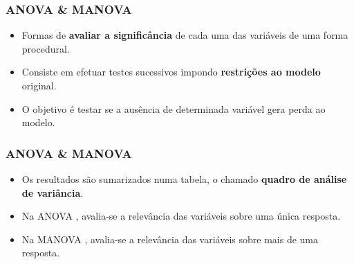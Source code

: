 \documentclass[10pt,
  aspectratio=169,
  serif,
  mathserif,
  professionalfont,
  compress,
  handout,
  ]{beamer}\usepackage[]{graphicx}\usepackage[]{color}
\begin{document}

\begin{frame}
  \frametitle{ANOVA \& MANOVA}

  \begin{itemize}
    \itemsep 2ex

  \item Formas de \textbf{avaliar a significância} de cada uma das variáveis de uma forma procedural.  
  
  \item Consiste em efetuar testes sucessivos impondo \textbf{restrições ao modelo} original. 

  \item O objetivo é testar se a ausência de determinada variável gera perda ao modelo. 

  \end{itemize}

\end{frame}


\begin{frame}
  \frametitle{ANOVA \& MANOVA}

  \begin{itemize}
    \itemsep 2ex
    
      \item Os resultados são sumarizados numa tabela, o chamado \textbf{quadro de análise de variância}.

  \item Na ANOVA \cite{anova_fisher}, avalia-se a relevância das variáveis sobre uma única resposta. 

  \item Na MANOVA \cite{manova}, avalia-se a relevância das variáveis sobre mais de uma resposta. 
  
  \end{itemize}

\end{frame}

\end{document}
